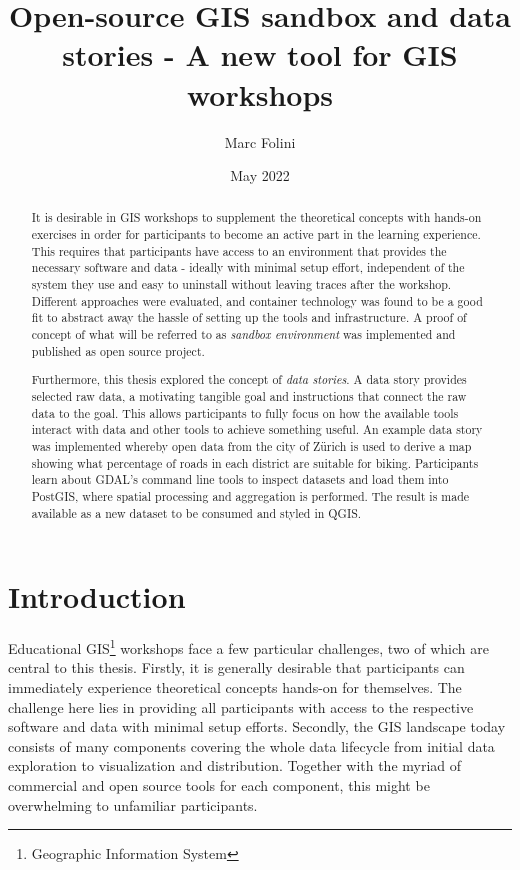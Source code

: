 \documentclass[11pt, a4paper, oneside, parskip=full-]{scrartcl}
\title{Open-source GIS sandbox and data stories - A new tool for GIS workshops}
\author{Marc Folini}
\date{May 2022}
\begin{document}
\begin{titlepage}
  \setcounter{page}{1}
  \clearpage\maketitle
  \thispagestyle{empty}
  \begin{abstract}
    It is desirable in GIS workshops to supplement the theoretical concepts with
    hands-on exercises in order for participants to become an active part in the
    learning experience. This requires that participants have access to an
    environment that provides the necessary software and data - ideally with
    minimal setup effort, independent of the system they use and easy to
    uninstall without leaving traces after the workshop. Different approaches
    were evaluated, and container technology was found to be a good fit to
    abstract away the hassle of setting up the tools and infrastructure. A proof
    of concept of what will be referred to as \emph{sandbox environment} was
    implemented and published as open source project.

    Furthermore, this thesis explored the concept of \emph{data stories}. A data
    story provides selected raw data, a motivating tangible goal and
    instructions that connect the raw data to the goal. This allows participants
    to fully focus on how the available tools interact with data and other tools
    to achieve something useful. An example data story was implemented whereby
    open data from the city of Zürich is used to derive a map showing what
    percentage of roads in each district are suitable for biking. Participants
    learn about GDAL's command line tools to inspect datasets and load them into
    PostGIS, where spatial processing and aggregation is performed. The result
    is made available as a new dataset to be consumed and styled in QGIS.
  \end{abstract}
\end{titlepage}

\newpage
\tableofcontents

\newpage
{}
\setcounter{page}{1}
\section{Introduction}
Educational GIS\footnote{Geographic Information System} workshops face a few
particular challenges, two of which are central to this thesis. Firstly, it is
generally desirable that participants can immediately experience theoretical
concepts hands-on for themselves. The challenge here lies in providing all
participants with access to the respective software and data with minimal setup
efforts. Secondly, the GIS landscape today consists of many components covering
the whole data lifecycle from initial data exploration to visualization and
distribution. Together with the myriad of commercial and open source tools for
each component, this might be overwhelming to unfamiliar participants.
\end{document}
